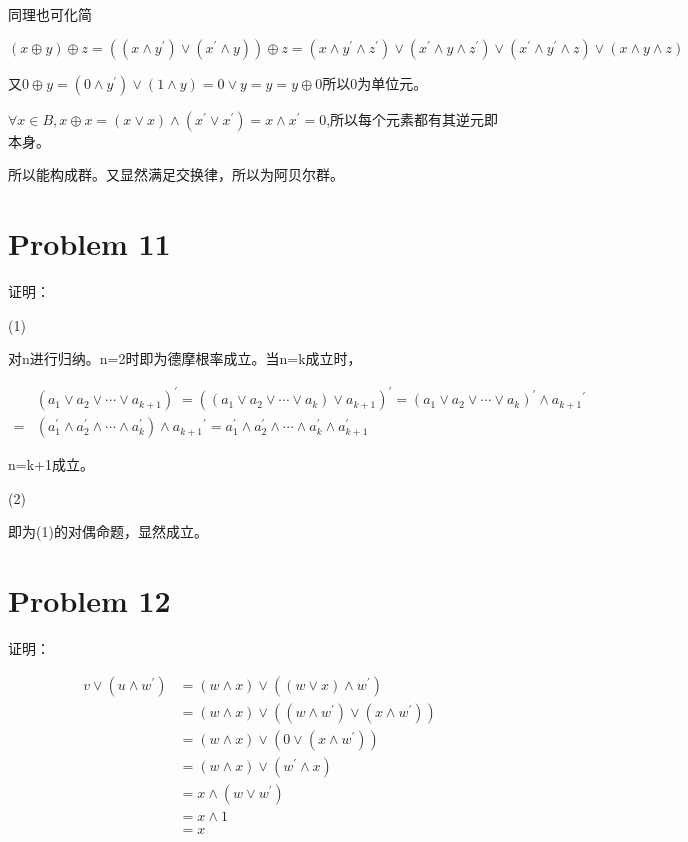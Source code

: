 \documentclass{article}
\begin{document}
同理也可化简

$(x \oplus y) \oplus z=\left(\left(x \wedge y^{\prime}\right) \vee\left(x^{\prime} \wedge y\right)\right) \oplus z =  \left(x \wedge y^{\prime} \wedge z^{\prime}\right) \vee\left(x^{\prime} \wedge y \wedge z^{\prime}\right) \vee\left(x^{\prime} \wedge y^{\prime} \wedge z\right) \vee(x \wedge y \wedge z) $

又$0 \oplus y=\left(0 \wedge y^{\prime}\right) \vee\left(1 \wedge y\right)=0\vee y=y = y\oplus 0$所以0为单位元。

$\forall x\in B,x\oplus x=(x\vee x)\wedge (x^{'}\vee x^{'})=x\wedge x^{'}=0$,所以每个元素都有其逆元即本身。

所以能构成群。又显然满足交换律，所以为阿贝尔群。
\section*{Problem 11}
证明：

(1)

对n进行归纳。n=2时即为德摩根率成立。当n=k成立时，

\begin{equation}
    \nonumber
    \begin{aligned}
        &\left(a_{1} \vee a_{2} \vee \cdots \vee a_{k+1}\right)^{\prime}=\left(\left(a_{1} \vee a_{2} \vee \cdots \vee a_{k}\right) \vee a_{k+1}\right)^{\prime}=\left(a_{1} \vee a_{2} \vee \cdots \vee a_{k}\right)^{\prime} \wedge a_{k+1}{ }^{\prime} \\
        =&\left(a_{1}^{\prime} \wedge a_{2}^{\prime} \wedge \cdots \wedge a_{k}^{\prime}\right) \wedge a_{k+1}{ }^{\prime}=a_{1}^{\prime} \wedge a_{2}^{\prime} \wedge \cdots \wedge a_{k}^{\prime} \wedge a_{k+1}^{\prime}
        \end{aligned}
\end{equation}

n=k+1成立。

(2)

即为(1)的对偶命题，显然成立。

\section*{Problem 12}
证明：

\begin{equation}
    \nonumber
    \begin{aligned}
        v \vee\left(u \wedge w^{\prime}\right) &=(w \wedge x) \vee\left((w \vee x) \wedge w^{\prime}\right) \\
        &=(w \wedge x) \vee\left(\left(w \wedge w^{\prime}\right) \vee\left(x \wedge w^{\prime}\right)\right) \\
        &=(w \wedge x) \vee\left(0 \vee\left(x \wedge w^{\prime}\right)\right) \\
        &=(w \wedge x) \vee\left(w^{\prime} \wedge x\right) \\
        &=x \wedge\left(w \vee w^{\prime}\right) \\
        &=x \wedge 1 \\
        &=x
        \end{aligned}
\end{equation}
\end{document}
